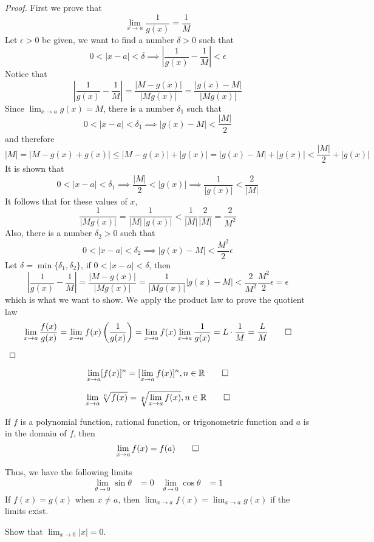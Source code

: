 \begin{proof}
    First we prove that \[\lim_{x\to a}\frac{1}{g(x)}=\frac{1}{M}\]
    Let \(\epsilon>0\) be given, we want to find a number \(\delta>0\) such that
    \[0<|x-a|<\delta\implies\left|\frac{1}{g(x)}-\frac{1}{M}\right|<\epsilon\]
    Notice that \[\left|\frac{1}{g(x)}-\frac{1}{M}\right|=\frac{|M-g(x)|}{|Mg(x)|}
    =\frac{|g(x)-M|}{|Mg(x)|}\]
    Since \(\lim_{x\to a}g(x)=M\), there is a number \(\delta_1\) such that
    \[0<|x-a|<\delta_1\implies|g(x)-M|<\frac{|M|}{2}\] and therefore
    \[|M|=|M-g(x)+g(x)|\leq|M-g(x)|+|g(x)|=|g(x)-M|+|g(x)|<\frac{|M|}{2}+|g(x)|\]
    It is shown that
    \[0<|x-a|<\delta_1\implies\frac{|M|}{2}<|g(x)|\implies\frac{1}{|g(x)|}
    <\frac{2}{|M|}\]
    It follows that for these values of \(x\),
    \[\frac{1}{|Mg(x)|}=\frac{1}{|M|\,|g(x)|}<\frac{1}{|M|}\frac{2}{|M|}
    =\frac{2}{M^2}\]
    Also, there is a number \(\delta_2>0\) such that
    \[0<|x-a|<\delta_2\implies|g(x)-M|<\frac{M^2}{2}\epsilon\]
    Let \(\delta=\min\{\delta_1,\delta_2\}\), if \(0<|x-a|<\delta\), then
    \[\left|\frac{1}{g(x)}-\frac{1}{M}\right|=\frac{|M-g(x)|}{|Mg(x)|}
    =\frac{1}{|Mg(x)|}|g(x)-M|<\frac{2}{M^2}\frac{M^2}{2}\epsilon=\epsilon\]
    which is what we want to show.
    We apply the product law to prove the quotient law
    \[\lim_{x\to a}\frac{f(x)}{g(x)}=\lim_{x\to a}f(x)\left(\frac{1}{g(x)}\right)
    =\lim_{x\to a}f(x)\lim_{x\to a}\frac{1}{g(x)}=L\cdot\frac{1}{M}
    =\frac{L}{M}\qedhere\]
\end{proof}
\begin{theorem}
    \[\lim_{x\to a}[f(x)]^n=[\lim_{x\to a}f(x)]^n,n\in\mathbb{R}\qedhere\]
\end{theorem}
\begin{theorem}
    \[\lim_{x\to a}\sqrt[n]{f(x)}=\sqrt[n]{\lim_{x\to a}f(x)},n\in\mathbb{R}\qedhere\]
\end{theorem}
\begin{theorem}
    If \(f\) is a polynomial function, rational function, or trigonometric
    function and \(a\) is in the domain of \(f\), then
    \[\lim_{x\to a}f(x)=f(a)\qedhere\]
\end{theorem}
Thus, we have the following limits
\begin{align*}
    \lim_{\theta\to 0}\sin\theta&=0 & \lim_{\theta\to 0}\cos\theta&=1
\end{align*}
If \(f(x)=g(x)\) when \(x\neq a\), then \(\lim_{x\to a}f(x)=\lim_{x\to a}g(x)\)
if the limits exist.
\begin{problem}
    Show that \(\displaystyle{\lim_{x\to 0}|x|=0}\).
\end{problem}
